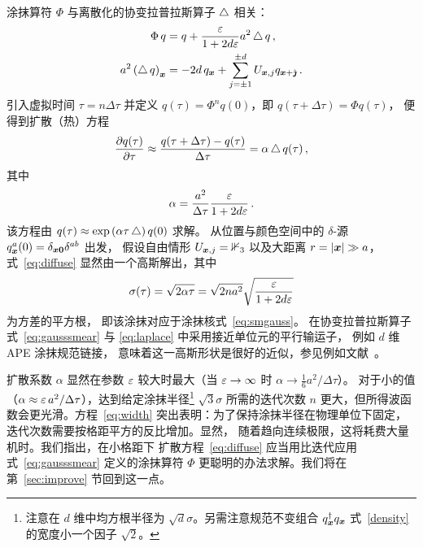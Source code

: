 涂抹算符 $\Phi$ 与离散化的协变拉普拉斯算子 $\mathop{{}\bigtriangleup}\nolimits$ 相关：
\begin{align}
\Phi\,q&=q+\frac{\varepsilon}{1+2d\varepsilon}a^2\mathop{{}\bigtriangleup}\nolimits q\,,\\
a^2\left(\mathop{{}\bigtriangleup}\nolimits q\right)_{\boldsymbol{x}}
&=-2d\, q_{\boldsymbol{x}}+\sum_{j=\pm 1}^{\pm d} U_{\boldsymbol{x},j} q_{\boldsymbol{x}+\hat{\boldsymbol{\jmath}}}\,.\label{eq:laplace}
\end{align}
引入虚拟时间 $\tau=n\Delta\tau$ 并定义
$q(\tau)=\Phi^nq(0)$，即 $q(\tau+\Delta\tau)=\Phi q(\tau)$，
便得到扩散（热）方程
\begin{equation}
\frac{\partial q(\tau)}{\partial\tau}\approx
\frac{q(\tau+\Delta\tau)-q(\tau)}{\Delta\tau}=\alpha\mathop{{}\bigtriangleup}\nolimits q(\tau)\,,\label{eq:diffuse}
\end{equation}
其中
\begin{equation}
\alpha=\frac{a^2}{\Delta\tau}\frac{\varepsilon}{1+2d\varepsilon}\,.
\label{eq:alphadef}
\end{equation}
该方程由 $q(\tau)\approx \exp\left(\alpha\tau\mathop{{}\bigtriangleup}\nolimits\right)q(0)$ 求解。
从位置与颜色空间中的 $\delta$-源
$q_{\boldsymbol{x}}^a(0)=\delta_{\boldsymbol{x}\boldsymbol{0}}\delta^{ab}$ 出发，
假设自由情形 $U_{\boldsymbol{x},j}=\mathbb{1}_3$
以及大距离 $r=|\boldsymbol{x}|\gg a$，式~\eqref{eq:diffuse}
显然由一个高斯解出，其中
\begin{equation}
\sigma(\tau)=\sqrt{2\alpha\tau}=\sqrt{2na^2}\sqrt{\frac{\varepsilon}{1+2d\varepsilon}}\label{eq:width}
\end{equation}
为方差的平方根，
即该涂抹对应于涂抹核式~\eqref{eq:smgauss}。
在协变拉普拉斯算子
式~\eqref{eq:gausssmear} 与 \eqref{eq:laplace}
中采用接近单位元的平行输运子，
例如 $d$ 维 APE 涂抹规范链接，
意味着这一高斯形状是很好的近似，参见例如文献~\cite{Bali:2011rd}。

扩散系数 $\alpha$ 显然在参数 $\varepsilon$
较大时最大（当 $\varepsilon\rightarrow\infty$ 时 $\alpha\rightarrow \frac16 a^2/\Delta\tau$）。
对于小的值（$\alpha\approx \varepsilon\, a^2/\Delta\tau$），达到给定涂抹半径\footnote{注意在 $d$ 维中均方根半径为
$\sqrt{d}\sigma$。另需注意规范不变组合
$q^{\dagger}_{\boldsymbol{x}}q_{\boldsymbol{x}}$ 式~\eqref{density}
的宽度小一个因子 $\sqrt{2}$。}
$\sqrt{3}\sigma$ 所需的迭代次数
$n$ 更大，但所得波函数会更光滑。方程~\eqref{eq:width} 突出表明：为了保持涂抹半径在物理单位下固定，
迭代次数需要按格距平方的反比增加。显然，
随着趋向连续极限，这将耗费大量机时。我们指出，在小格距下
扩散方程~\eqref{eq:diffuse} 应当用比迭代应用
式~\eqref{eq:gausssmear} 定义的涂抹算符
$\Phi$ 更聪明的办法求解。我们将在第~\ref{sec:improve} 节回到这一点。

